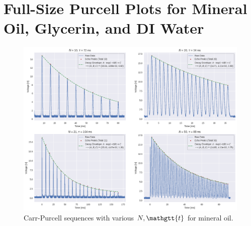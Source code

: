 \documentclass[
    floatfix,  %
    reprint,
    amsmath,
    amssymb,
    aps,
]{revtex4-2}
\newcommand{\taucode}{\mathgtt{t}}
\begin{document}


\nocite{*}













\clearpage

\onecolumngrid
\appendix
\section{Full-Size Purcell Plots for Mineral Oil, Glycerin, and DI Water}

\begin{figure}[htbp]
    \centering
    \includegraphics[width=\textwidth]{figs/purcell/mineral_oil.png}
    \caption{Carr-Purcell sequences with various $N, \taucode$ for mineral oil.}
    \label{fig:purcell/mineral_oil}
\end{figure}
\end{document}
